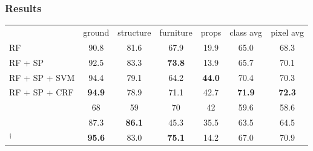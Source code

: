 \documentclass[final,ignorenonframetext,compress]{beamer}
\begin{document}
    \begin{frame}
        \frametitle{Results}
        \begin{table}[t]
        \begin{tabularx}{\linewidth}{@{\extracolsep{\fill}}lcccccc}
        \toprule
                                & \footnotesize ground        & \footnotesize  structure    & \footnotesize furniture     & \footnotesize props         & \footnotesize class avg   & \footnotesize pixel avg\\
        \cmidrule(r){1-7}

        \footnotesize RF                              &         90.8  &   81.6        & 67.9          & 19.9          &  65.0        &  68.3 \\
        \footnotesize RF + SP                         &         92.5  &   83.3        & \textbf{73.8} & 13.9          &  65.7        &  70.1 \\ 
        \footnotesize RF + SP + SVM                   &         94.4  &   79.1        & 64.2          & \textbf{44.0} &  70.4        &  70.3 \\
        \footnotesize RF + SP + CRF                   & \textbf{94.9} &   78.9        &          71.1 & 42.7          &\textbf{71.9} &  \textbf{72.3} \\
        \cmidrule(r){1-7}
        \footnotesize \citet{SilbermanECCV12}         &         68    &   59          & 70           & 42            &  59.6        & 58.6 \\
        \footnotesize \citet{couprie-iclr-13}         &         87.3  & \textbf{86.1} & 45.3         & 35.5          &  63.5        & 64.5 \\
        \cmidrule(r){1-7}
        \footnotesize \citet{stueckler2013}$^\dagger$ & \textbf{95.6} &   83.0        & \textbf{75.1}& 14.2          &  67.0        & 70.9 \\

        \bottomrule
        \end{tabularx}
        \end{table}
    \end{frame}
\end{document}
